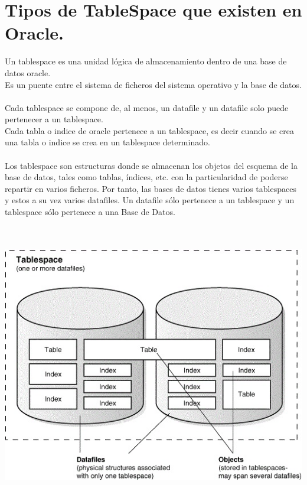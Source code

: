 \section{Tipos de TableSpace que existen en Oracle.} 
\vspace{\baselineskip}
Un tablespace es una unidad lógica de almacenamiento dentro de una base de datos oracle.\\
Es un puente entre el sistema de ficheros del sistema operativo y la base de datos.\\ \\
Cada tablespace se compone de, al menos, un datafile y un datafile solo puede pertenecer a un tablespace.\\
Cada tabla o indice de oracle pertenece a un tablespace, es decir cuando se crea una tabla o indice se crea en un tablespace determinado.\\ \\
Los tablespace son estructuras donde se almacenan los objetos del esquema de la base de datos, tales como tablas, índices, etc. con la particularidad de poderse repartir en varios ficheros. Por tanto, las bases de datos tienes varios tablespaces y estos a su vez varios datafiles. Un datafile sólo pertenece a un tablespace y un tablespace sólo pertenece a una Base de Datos.
\\
\\
\\
\begin{center}
	\includegraphics[width=14cm]{./Imagenes/4} 
\end{center}

